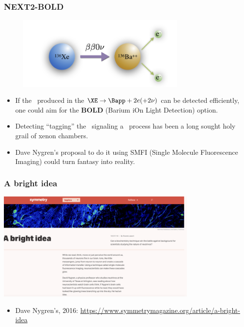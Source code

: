 \begin{frame}
\frametitle{NEXT2-BOLD}

\begin{figure}[tbh!]
  \begin{center}
      \includegraphics[width=0.75\textwidth]{moriond/bata.png}   
  \end{center}
\end{figure}
\begin{itemize} 
\item If the \Bapp\ produced in the $\XE \rightarrow \Bapp + 2 e (+ 2  \nu)$ can be detected efficiently, one could aim for the {\bf BOLD} (Barium iOn Light Detection) option.  
\item Detecting ``tagging'' the \Bapp\ signaling a \bbonu\ process has been a long sought holy grail of xenon chambers. 
\item Dave Nygren's proposal to do it using SMFI (Single Molecule Fluorescence Imaging) could turn fantasy into reality.   
\end{itemize}
\end{frame}

\begin{frame}
\frametitle{A bright idea}
  \begin{center}
      \includegraphics[width=0.75\textwidth]{moriond/nygren-smfi.png}   
  \end{center}
\begin{itemize} 
\item Dave Nygren's, 2016: \url{https://www.symmetrymagazine.org/article/a-bright-idea}    
\end{itemize}
\end{frame}

